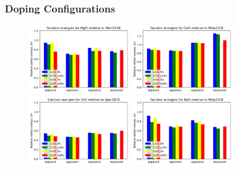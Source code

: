 \documentclass{beamer}
\begin{document}
\begin{frame}
\frametitle{Doping Configurations}

\begin{figure}
\includegraphics[width=0.4\textwidth]{mg_relative.jpg}
\includegraphics[width=0.4\textwidth]{ca_relative.jpg}
\includegraphics[width=0.4\textwidth]{sr_relative.jpg}
\includegraphics[width=0.4\textwidth]{ba_relative.jpg}
\end{figure}

\end{frame}
\end{document}
